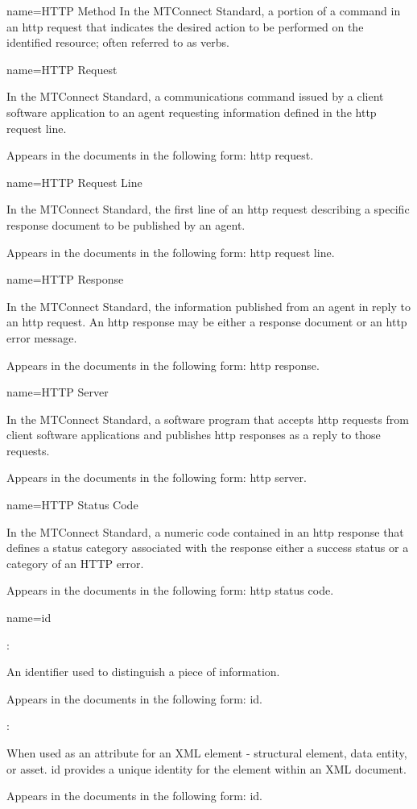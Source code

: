{
  name={HTTP Method}
}
{
	In the MTConnect Standard, a portion of a command in an \gls{http request} that indicates the desired action to be performed on the identified resource; often referred to as verbs.
}


{
  name={HTTP Request}
}
{
	In the MTConnect Standard, a communications command issued by a client software application to an \gls{agent} requesting information defined in the \gls{http request line}.

	Appears in the documents in the following form: \gls{http request}.
}


{
  name={HTTP Request Line}
}
{
	In the MTConnect Standard, the first line of an \gls{http request} describing a specific \gls{response document} to be published by an \gls{agent}.

	Appears in the documents in the following form: \gls{http request line}.
}


{
  name={HTTP Response}
}
{
	In the MTConnect Standard, the information published from an \gls{agent} in reply to an \gls{http request}.  An \gls{http response} may be either a \gls{response document} or an \gls{http error message}.

	Appears in the documents in the following form: \gls{http response}.
}


{
  name={HTTP Server}
}
{
	In the MTConnect Standard, a software program that accepts \glspl{http request} from client software applications and publishes \glspl{http response} as a reply to those \glspl{request}.

	Appears in the documents in the following form: \gls{http server}.
}


{
  name={HTTP Status Code}
}
{
	In the MTConnect Standard, a numeric code contained in an \gls{http response} that defines a status category associated with the \gls{response}  either a success status or a category of an HTTP error.  

	Appears in the documents in the following form: \gls{http status code}.
}


{
  name={id}
}
{
	:

	An identifier used to distinguish a piece of information.

	Appears in the documents in the following form: id.

	:

	When used as an attribute for an XML element - \gls{structural element}, \gls{data entity}, or \gls{asset}.  \gls{id} provides a unique identity for the element within an XML document.

	Appears in the documents in the following form: \gls{id}.
}


